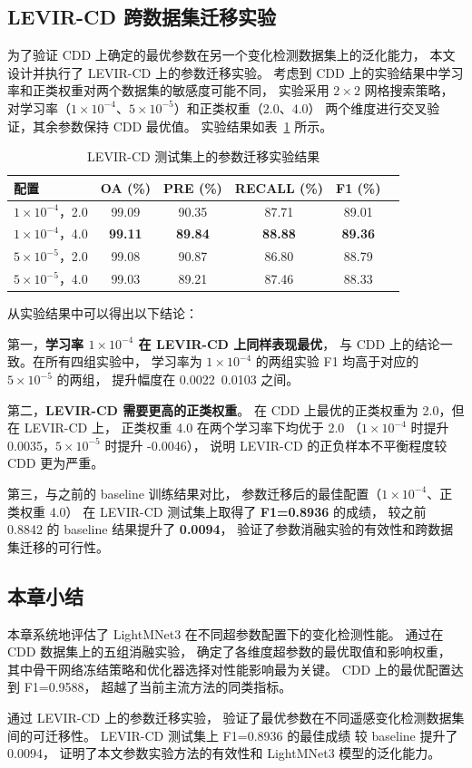 \documentclass[UTF8]{ctexart}
\begin{document}
\subsection{LEVIR-CD 跨数据集迁移实验}

为了验证 CDD 上确定的最优参数在另一个变化检测数据集上的泛化能力，
本文设计并执行了 LEVIR-CD 上的参数迁移实验。
考虑到 CDD 上的实验结果中学习率和正类权重对两个数据集的敏感度可能不同，
实验采用 $2\times2$ 网格搜索策略，
对学习率（$1\times10^{-4}$、$5\times10^{-5}$）和正类权重（$2.0$、$4.0$）
两个维度进行交叉验证，其余参数保持 CDD 最优值。
实验结果如表~\ref{tab:levircd_scan} 所示。

\begin{table}[htbp]
\centering
\caption{LEVIR-CD 测试集上的参数迁移实验结果}
\label{tab:levircd_scan}
\begin{tabular}{lccccc}
\hline
配置 & OA (\%) & PRE (\%) & RECALL (\%) & F1 (\%) \\
\hline
$1\times10^{-4}$，2.0 & 99.09 & 90.35 & 87.71 & 89.01 \\
$1\times10^{-4}$，4.0 & \textbf{99.11} & \textbf{89.84} & \textbf{88.88} & \textbf{89.36} \\
$5\times10^{-5}$，2.0 & 99.08 & 90.87 & 86.80 & 88.79 \\
$5\times10^{-5}$，4.0 & 99.03 & 89.21 & 87.46 & 88.33 \\
\hline
\end{tabular}
\end{table}

从实验结果中可以得出以下结论：

第一，\textbf{学习率 $1\times10^{-4}$ 在 LEVIR-CD 上同样表现最优}，
与 CDD 上的结论一致。在所有四组实验中，
学习率为 $1\times10^{-4}$ 的两组实验 F1 均高于对应的 $5\times10^{-5}$ 的两组，
提升幅度在 0.0022~0.0103 之间。

第二，\textbf{LEVIR-CD 需要更高的正类权重}。
在 CDD 上最优的正类权重为 2.0，但在 LEVIR-CD 上，
正类权重 4.0 在两个学习率下均优于 2.0
（$1\times10^{-4}$ 时提升 0.0035，$5\times10^{-5}$ 时提升 -0.0046），
说明 LEVIR-CD 的正负样本不平衡程度较 CDD 更为严重。

第三，与之前的 baseline 训练结果对比，
参数迁移后的最佳配置（$1\times10^{-4}$、正类权重 4.0）
在 LEVIR-CD 测试集上取得了 \textbf{F1=0.8936} 的成绩，
较之前 0.8842 的 baseline 结果提升了 \textbf{0.0094}，
验证了参数消融实验的有效性和跨数据集迁移的可行性。

\subsection{本章小结}

本章系统地评估了 LightMNet3 在不同超参数配置下的变化检测性能。
通过在 CDD 数据集上的五组消融实验，
确定了各维度超参数的最优取值和影响权重，
其中骨干网络冻结策略和优化器选择对性能影响最为关键。
CDD 上的最优配置达到 F1=0.9588，
超越了当前主流方法的同类指标。

通过 LEVIR-CD 上的参数迁移实验，
验证了最优参数在不同遥感变化检测数据集间的可迁移性。
LEVIR-CD 测试集上 F1=0.8936 的最佳成绩
较 baseline 提升了 0.0094，
证明了本文参数实验方法的有效性和 LightMNet3 模型的泛化能力。
\end{document}
